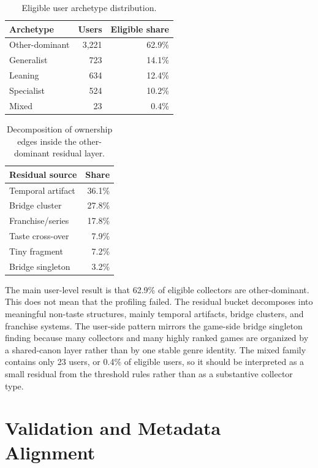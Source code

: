 \documentclass[10pt,twocolumn]{article}
\begin{document}
\begin{table}[!htbp]
\centering
\caption{Eligible user archetype distribution.}
\label{tab:users}
\begin{tabular}{lrr}
\toprule
Archetype & Users & Eligible share \\
\midrule
Other-dominant & 3,221 & 62.9\% \\
Generalist & 723 & 14.1\% \\
Leaning & 634 & 12.4\% \\
Specialist & 524 & 10.2\% \\
Mixed & 23 & 0.4\% \\
\bottomrule
\end{tabular}
\end{table}

\begin{table}[!htbp]
\centering
\caption{Decomposition of ownership edges inside the other-dominant residual layer.}
\label{tab:other}
\begin{tabular}{lr}
\toprule
Residual source & Share \\
\midrule
Temporal artifact & 36.1\% \\
Bridge cluster & 27.8\% \\
Franchise/series & 17.8\% \\
Taste cross-over & 7.9\% \\
Tiny fragment & 7.2\% \\
Bridge singleton & 3.2\% \\
\bottomrule
\end{tabular}
\end{table}

The main user-level result is that 62.9\% of eligible collectors are other-dominant. This does not mean that the profiling failed. The residual bucket decomposes into meaningful non-taste structures, mainly temporal artifacts, bridge clusters, and franchise systems. The user-side pattern mirrors the game-side bridge singleton finding because many collectors and many highly ranked games are organized by a shared-canon layer rather than by one stable genre identity.
The mixed family contains only 23 users, or 0.4\% of eligible users, so it should be interpreted as a small residual from the threshold rules rather than as a substantive collector type.

\section{Validation and Metadata Alignment}
\end{document}
